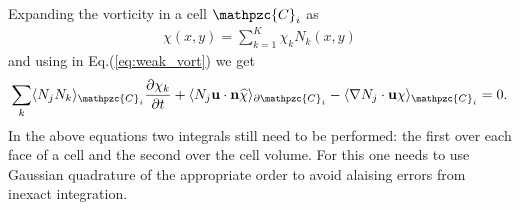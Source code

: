 \documentclass[11pt, reqno]{amsart}
\newcommand{\eqr}[1]{Eq.\thinspace(#1)}
\newcommand{\pfrac}[2]{\frac{\partial #1}{\partial #2}}
\newcommand{\mvec}[1]{\mathbf{#1}}
\newcommand{\script}[1]{\mathpzc{#1}}
\newcommand{\iprod}[2]{\langle{#1}\rangle_{#2}}
\theoremstyle{definition}
\begin{document}
Expanding the vorticity in a cell $\script{C}_i$ as
\begin{align}
  \chi(x,y) = \sum_{k=1}^K \chi_k N_k(x,y)
\end{align}
and using in \eqr{\ref{eq:weak_vort}} we get
\begin{align}
  \sum_{k} \iprod{N_jN_k}{\script{C}_i} \pfrac{\chi_k}{t}
  +
  \iprod{N_j\mvec{u}\cdot\mvec{n} \widehat{\chi}}{\partial \script{C}_i}
  -
  \iprod{\nabla N_j\cdot\mvec{u} \chi}{\script{C}_i}
  = 0. \label{eq:dg_vort}
\end{align}
In the above equations two integrals still need to be performed: the
first over each face of a cell and the second over the cell
volume. For this one needs to use Gaussian quadrature of the
appropriate order to avoid alaising errors from inexact integration.
\end{document}
